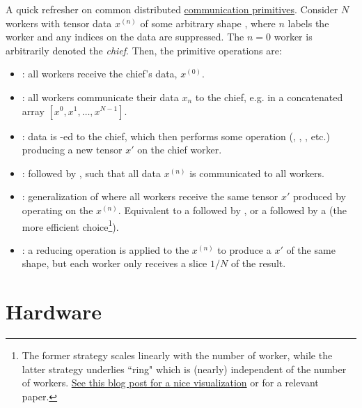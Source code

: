 \documentclass[11pt]{article}
\begin{document}
A quick refresher on common distributed
\href{https://docs.nvidia.com/deeplearning/nccl/user-guide/docs/usage/collectives.html}{communication
primitives}.  Consider $ N $ workers with tensor data $ x ^{ (n) }  $ of some arbitrary shape
, where $ n $ labels the worker and any indices on the data are suppressed. The $
n=0 $ worker is arbitrarily denoted the \textit{chief}.  Then, the primitive operations are:
\begin{itemize}
    \item {}: all workers receive  the chief's data, $ x ^{ (0) }  $.
    \item {}: all workers communicate their data $ x _{ n } $ to the chief, e.g. in a
        concatenated array $ [x ^{ 0 }, x ^{ 1 }, \ldots , x ^{ N-1 }] $.
    \item {}: data is -ed to the chief, which then performs some
        operation (, , , etc.) producing a new tensor $
        x' $ on the chief worker.
    \item {}:  followed by , such that all
        data $ x ^{ (n) } $ is communicated to all workers.
    \item {}: generalization of  where all
        workers receive the same tensor $ x' $ produced by operating on the $ x ^{ (n) } $.
        Equivalent to a  followed by , or a
         followed by a  (the more efficient
        choice\footnote{The former strategy scales linearly with the number of worker, while the
            latter strategy underlies ``ring"  which is (nearly) independent of
            the number of workers.
            \href{https://andrew.gibiansky.com/blog/machine-learning/baidu-allreduce/}{See this blog
                post for a nice visualization} or \cite{bandwidthOptimalAllReduce2009} for a
            relevant paper.\label{foot_all_reduce}}).
    \item {}: a reducing operation is applied to the $ x ^{ (n) } $ to produce
        a $ x' $ of the same shape, but each worker only receives a slice $ 1/N $ of the result.
\end{itemize}



\section{Hardware}
\end{document}
